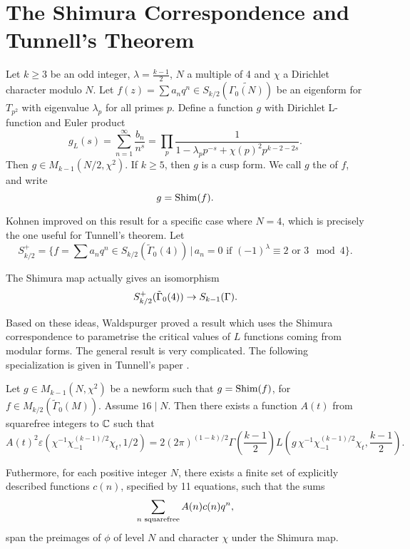 \documentclass[12pt, a4paper]{report}
\begin{document}
\section{The Shimura Correspondence and Tunnell's Theorem}

\begin{thm}
  Let $k \geq 3$ be an odd integer, $\lambda = \frac{k-1}{2}$, $N$ a multiple of
  4 and $\chi$ a Dirichlet character modulo $N$. Let $f(z) = \sum a_n q^n \in
  S_{k/2}(\tilde{\Gamma_0(N)})$ be an eigenform for $T_{p^2}$ with eigenvalue
  $\lambda_p$ for all primes $p$. Define a function $g$ with Dirichlet
  L-function and Euler product
  \[g_L(s) = \sum\limits_{n=1}^\infty \frac{b_n}{n^s} = \prod\limits_p
    \frac{1}{1 - \lambda_p p^{-s} + \chi(p)^2 p^{k-2-2s}}.\]
  Then $g \in M_{k-1}(N/2, \chi^2)$.
  If $k \geq 5$, then $g$ is a cusp form. We call $g$ the
   of $f$, and write
  \[g = \textnormal{Shim}(f).\]
\end{thm}

Kohnen improved on this result for a specific case where $N = 4$, which is
precisely the one useful for Tunnell's theorem. Let
\[S_{k/2}^+ = \{f = \sum a_n q^n \in S_{k/2}(\tilde{\Gamma}_0(4)) \, | \,
  a_n = 0 \text{ if } (-1)^\lambda \equiv 2 \text{ or } 3 \mod{4}\}.\]

\begin{thm}
  The Shimura map actually gives an isomorphism
  \[S_{k/2}^+(\tilde{\Gamma}_0(4)) \rightarrow S_{k-1}(\Gamma).\]
\end{thm}

Based on these ideas, Waldspurger proved a result which uses the Shimura
correspondence to parametrise the critical values of $L$ functions coming from
modular forms. The general result is very complicated. The following
specialization is given in Tunnell's paper \cite[Page 328]{Tunnell}.

\begin{thm}
  Let $g \in M_{k-1}(N, \chi^2)$ be a newform such that $g = \textnormal{Shim}(f)$, for
  $f \in M_{k/2}(\tilde{\Gamma}_0(M))$. Assume $16 \mid N$. Then there exists a
  function $A(t)$ from squarefree integers to ${\mathbb C}$ such that
  $$A(t)^2 \varepsilon(\chi^{-1} \chi_{-1}^{(k-1)/2} \chi_t, 1/2)
  =2(2\pi)^{(1-k)/2} \Gamma\left(\frac{k-1}{2}\right)
  L\left(g \, \chi^{-1} \chi_{-1}^{(k-1)/2}
      \chi_t, \frac{k-1}{2}\right).$$

  Futhermore, for each positive integer $N$, there exists a finite set of explicitly
  described functions $c(n)$, specified by 11 equations, such that the sums
  \[\sum\limits_{n \textnormal{ squarefree}} A(n)c(n)q^n,\]
  span the preimages of $\phi$ of level $N$ and character $\chi$ under the
  Shimura map.
\end{thm}
\end{document}
